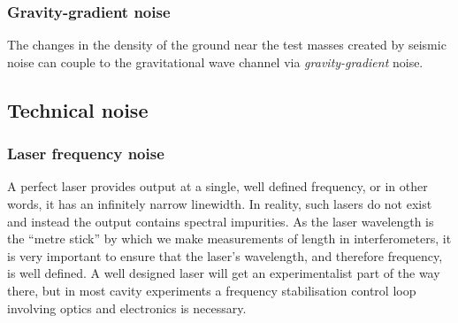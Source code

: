 \subsubsection{Gravity-gradient noise}

The changes in the density of the ground near the test masses created by seismic noise can couple to the gravitational wave channel via \emph{gravity-gradient} noise.



\subsection{Technical noise}

\subsubsection{Laser frequency noise}
A perfect laser provides output at a single, well defined frequency, or in other words, it has an infinitely narrow linewidth. In reality, such lasers do not exist and instead the output contains spectral impurities. As the laser wavelength is the ``metre stick'' by which we make measurements of length in interferometers, it is very important to ensure that the laser's wavelength, and therefore frequency, is well defined. A well designed laser will get an experimentalist part of the way there, but in most cavity experiments a frequency stabilisation control loop involving optics and electronics is necessary.

